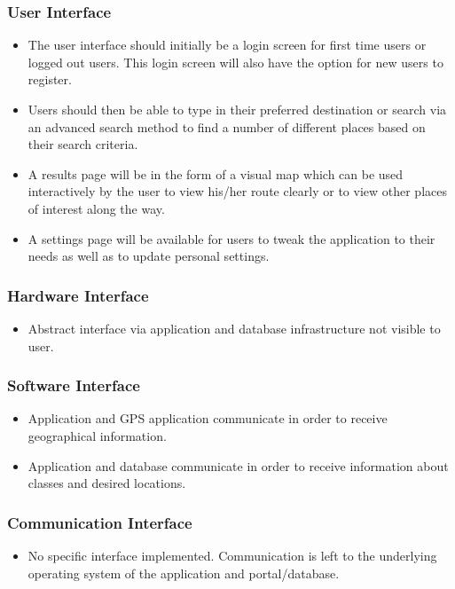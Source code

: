 \documentclass{article}
\begin{document}
		\subsubsection{User Interface}
		\begin{itemize}
		\item The user interface should initially be a login screen for first time users or logged out users. This login screen will also have the option for new users to register.
		\item Users should then be able to type in their preferred destination or search via an advanced search method to find a number of different places based on their search criteria.
		\item A results page will be in the form of a visual map which can be used interactively by the user to view his/her route clearly or to view other places of interest along the way.
		\item A settings page will be available for users to tweak the application to their needs as well as to update personal settings.\newline
		\end{itemize}
		
		\subsubsection{Hardware Interface}
		\begin{itemize}
		\item Abstract interface via application and database infrastructure not visible to user.\newline
		\end{itemize}
		
		\subsubsection{Software Interface}
		\begin{itemize}
		\item Application and GPS application communicate in order to receive geographical information. 			\item Application and database communicate in order to receive information about classes and desired locations.\newline
		\end{itemize}
		
		\subsubsection{Communication Interface}
		\begin{itemize}
		\item No specific interface implemented. Communication is left to the underlying operating system of the application and portal/database.\newline
		\end{itemize}
		
\end{document}
